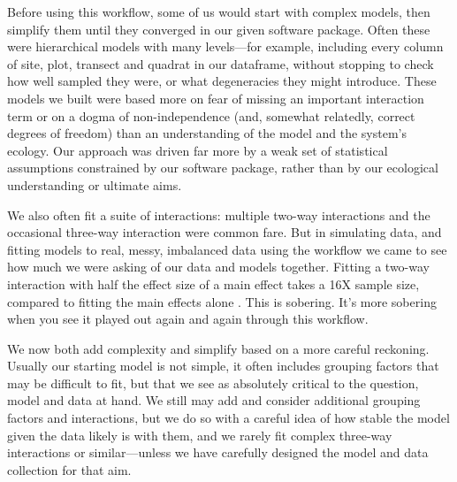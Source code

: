 \documentclass[11pt]{article}
\begin{document}
Before using this workflow, some of us would start with complex models, then simplify them until they converged in our given software package. Often these were hierarchical models with many levels---for example, including every column of site, plot, transect and quadrat in our dataframe, without stopping to check how well sampled they were, or what degeneracies they might introduce. These models we built were based more on fear of missing an important interaction term or on a dogma of non-independence (and, somewhat relatedly, correct degrees of freedom) than an understanding of the model and the system's ecology. Our approach was driven far more by a weak set of statistical assumptions constrained by our software package, rather than by our ecological understanding or ultimate aims. 

We also often fit a suite of interactions: multiple two-way interactions and the occasional three-way interaction were common fare. But in simulating data, and fitting models to real, messy, imbalanced data using the workflow we came to see how much we were asking of our data and models together. Fitting a two-way interaction with half the effect size of a main effect takes a 16X sample size, compared to fitting the main effects alone \citep[the main effects then average over the interactions, see][for more details]{regotherstories}. This is sobering. It's more sobering when you see it played out again and again through this workflow. 

We now both add complexity and simplify based on a more careful reckoning. Usually our starting model is not simple, it often includes grouping factors that may be difficult to fit, but that we see as absolutely critical to the question, model and data at hand. We still may add and consider additional grouping factors and interactions, but we do so with a careful idea of how stable the model given the data likely is with them, and we rarely fit complex three-way interactions or similar---unless we have carefully designed the model and data collection for that aim. %
\end{document}
